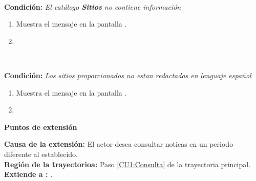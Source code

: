 \begin{large}
	\\
\end{large}	
\textbf{Condición:} \textit{El catálogo \textbf{Sitios} no contiene información}

\begin{enumerate}[{A-}1.]

	\item \sistema Muestra el mensaje  en la pantalla .
	\item \finCU	

\end{enumerate}

\begin{large}
	\\
\end{large}	
\textbf{Condición:} \textit{Los sitios proporcionados no estan redactados en lenguaje español}

\begin{enumerate}[{B-}1.]

	\item \sistema Muestra el mensaje   en la pantalla .
	\item \finCU	

\end{enumerate}


\begin{large}
	\textbf{Puntos de extensión}\\
\end{large}	

\textbf{Causa de la extensión:} El actor desea consultar noticas en un periodo diferente al establecido.\\
\textbf{Región de la trayectorioa:} Paso \ref{CU1:Consulta} de la trayectoria principal.\\
\textbf{Extiende a :} .\\\\



